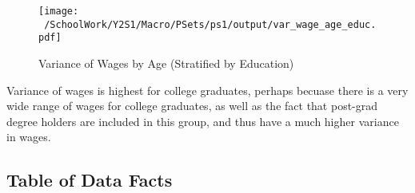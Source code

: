 \documentclass[12pt]{article}
\begin{document}
\begin{figure}[h!]
    \centering
    \texttt{[image: ~/SchoolWork/Y2S1/Macro/PSets/ps1/output/var\_wage\_age\_educ.pdf]}
    \caption{Variance of Wages by Age (Stratified by Education)}
\end{figure}

Variance of wages is highest for college graduates, perhaps becuase there is a very wide range of wages for college graduates, as well as the fact that post-grad degree
holders are included in this group, and thus have a much higher variance in wages.

\subsection*{Table of Data Facts}
\end{document}
